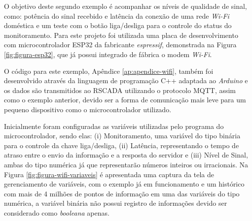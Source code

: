 O objetivo deste segundo exemplo é acompanhar os níveis de qualidade de sinal, como: potência do sinal recebido e latência da conexão de uma rede  \textit{Wi-Fi} doméstica e um teste com o botão liga/desliga para o controle do status do monitoramento. Para este projeto foi utilizada uma placa de desenvolvimento com microcontrolador ESP32 da fabricante \textit{espressif}, demonstrada na Figura \ref{fig:figura-esp32}, que já possui integrado de fábrica o modem \textit{Wi-Fi}.

O código para este exemplo, Apêndice \ref{ap:apendice-wifi}, também foi desenvolvido através da linguagem de programação C++ adaptada ao \textit{Arduino} e os dados são transmitidos ao RSCADA utilizando o protocolo \gls{MQTT}, assim como o exemplo anterior, devido ser a forma de comunicação mais leve para um pequeno dispositivo como o microcontrolador utilizado.

        \begin{figure}[!h]
    	\end{figure}
    	
Inicialmente foram configuradas as variáveis utilizadas pelo programa do microcontrolador, sendo elas: (i) Monitoramento, uma variável do tipo binária para o controle da chave liga/desliga, (ii)  Latência, representando o tempo de atraso entre o envio da informação e a resposta do servidor e (iii) Nível de Sinal, ambas do tipo numérica já que representarão números inteiros ou irracionais. Na Figura \ref{fig:figura-wifi-variaveis} é apresentada uma captura da tela de gerenciamento de variáveis, com o exemplo já em funcionamento e um histórico com mais de 4 milhões de pontos de informação em uma das variáveis do tipo numérica, a variável binária não possui registro de informações devido ser considerado como  \textit{booleana} apenas.

